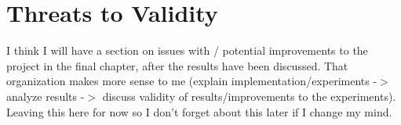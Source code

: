 \section{Threats to Validity}
I think I will have a section on issues with / potential improvements to the project in the final chapter, after the results have been discussed.  That organization makes more sense to me (explain implementation/experiments -$>$ analyze results -$>$ discuss validity of results/improvements to the experiments).  Leaving this here for now so I don't forget about this later if I change my mind.